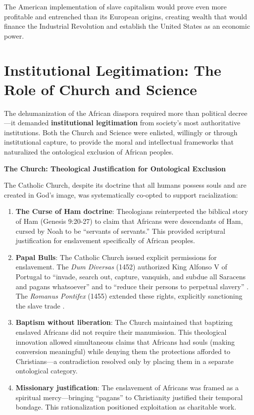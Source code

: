 \documentclass[12pt,openany]{book}
\begin{document}
The American implementation of slave capitalism would prove even more profitable and entrenched than its European origins, creating wealth that would finance the Industrial Revolution and establish the United States as an economic power.

\section{Institutional Legitimation: The Role of Church and Science}

The dehumanization of the African diaspora required more than political decree---it demanded \textbf{institutional legitimation} from society's most authoritative institutions. Both the Church and Science were enlisted, willingly or through institutional capture, to provide the moral and intellectual frameworks that naturalized the ontological exclusion of African peoples.

\textbf{The Church: Theological Justification for Ontological Exclusion}

The Catholic Church, despite its doctrine that all humans possess souls and are created in God's image, was systematically co-opted to support racialization:

\begin{enumerate}
    \item \textbf{The Curse of Ham doctrine}: Theologians reinterpreted the biblical story of Ham (Genesis 9:20-27) to claim that Africans were descendants of Ham, cursed by Noah to be ``servants of servants.'' This provided scriptural justification for enslavement specifically of African peoples.
    
    \item \textbf{Papal Bulls}: The Catholic Church issued explicit permissions for enslavement. The \textit{Dum Diversas} (1452) authorized King Alfonso V of Portugal to ``invade, search out, capture, vanquish, and subdue all Saracens and pagans whatsoever'' and to ``reduce their persons to perpetual slavery'' \cite{dumdiversas}. The \textit{Romanus Pontifex} (1455) extended these rights, explicitly sanctioning the slave trade \cite{romanuspontifex}.
    
    \item \textbf{Baptism without liberation}: The Church maintained that baptizing enslaved Africans did not require their manumission. This theological innovation allowed simultaneous claims that Africans had souls (making conversion meaningful) while denying them the protections afforded to Christians---a contradiction resolved only by placing them in a separate onto\-logical category.
    
    \item \textbf{Missionary justification}: The enslavement of Africans was framed as a spiritual mercy---bringing ``pagans'' to Christianity justified their temporal bondage. This rationalization positioned exploitation as charitable work.
\end{enumerate}
\end{document}
